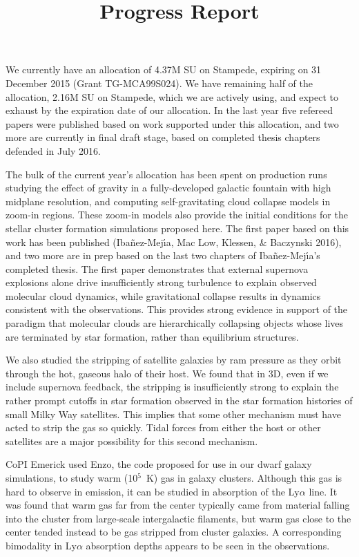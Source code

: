 \documentclass[12pt,preprint]{article}
\title{Progress Report}
\begin{document}
\maketitle
We currently have an allocation of 4.37M SU on Stampede, expiring on 31 December 2015 (Grant TG-MCA99S024).  We have remaining half of the allocation, 2.16M SU on Stampede, which we are actively using, and expect to exhaust by the expiration date of our allocation.  In the last year five refereed papers were published based on work supported under this allocation, and two more are currently in final draft stage, based on completed thesis chapters defended in July 2016.

The bulk of the current year's allocation has been spent on production runs studying the effect of gravity in a fully-developed galactic fountain with high midplane resolution, and computing self-gravitating cloud collapse models in zoom-in regions. These zoom-in models also provide the initial conditions for the stellar cluster formation simulations proposed here. The first paper based on this work has been published (Iba\~nez-Mej\'{\i}a, Mac Low, Klessen, \& Baczynski 2016), and two more are in prep based on the last two chapters of Iba\~nez-Mej\'{\i}a's completed thesis. The first paper demonstrates that external supernova explosions alone drive insufficiently strong turbulence to explain observed molecular cloud dynamics, while gravitational collapse results in dynamics consistent with the observations. This provides strong evidence in support of the paradigm that molecular clouds are hierarchically collapsing objects whose lives are terminated by star formation, rather than equilibrium structures.  

We also studied the stripping of satellite galaxies by ram pressure as they orbit through the hot, gaseous halo of their host. We found that in 3D, even if we include supernova feedback, the stripping is insufficiently strong to explain the rather prompt cutoffs in star formation observed in the star formation histories of small Milky Way satellites.  This implies that some other mechanism must have acted to strip the gas so quickly. Tidal forces from either the host or other satellites are a major possibility for this second mechanism.

CoPI Emerick used Enzo, the code proposed for use in our dwarf galaxy simulations, to study warm (10$^5$~K) gas in galaxy clusters.  Although this gas is hard to observe in emission, it can be studied in absorption of the Ly$\alpha$ line.  It was found that warm gas far from the center typically came from material falling into the cluster from large-scale intergalactic filaments, but warm gas close to the center tended instead to be gas stripped from cluster galaxies.  A corresponding bimodality in Ly$\alpha$ absorption depths appears to be seen in the observations.
\end{document}
